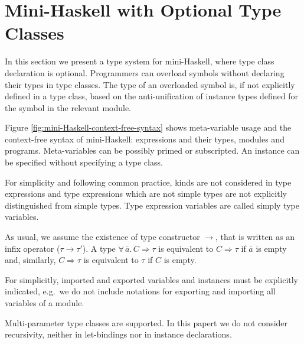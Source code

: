 \section{Mini-Haskell with Optional Type Classes}
\label{Optional-type-classes}

In this section we present a type system for mini-Haskell, where type
class declaration is optional. Programmers can overload symbols
without declaring their types in type classes. The type of an
overloaded symbol is, if not explicitly defined in a type class, based
on the anti-unification of instance types defined for the symbol in
the relevant module.

Figure \ref{fig:mini-Haskell-context-free-syntax} shows meta-variable
usage and the context-free syntax of mini-Haskell: expressions and
their types, modules and programs. Meta-variables can be possibly
primed or subscripted. An instance can be specified without specifying
a type class. 


For simplicity and following common practice, kinds are not considered
in type expressions and type expressions which are not simple types
are not explicitly distinguished from simple types. Type expression
variables are called simply type variables. 

As usual, we assume the existence of type constructor $\to$, that is
written as an infix operator ($\tau \to \tau'$). A type
$\forall\,\overline{a}.\,C\Rightarrow \tau$ is equivalent to
$C\Rightarrow \tau$ if $\overline{a}$ is empty and, similarly,
$C\Rightarrow \tau$ is equivalent to $\tau$ if $C$ is empty.

For simplicitly, imported and exported variables and instances must be
explicitly indicated, e.g.~we do not include notations for exporting
and importing all variables of a module.

Multi-parameter type classes are supported. In this papert we do not
consider recursivity, neither in let-bindings nor in instance
declarations. 

